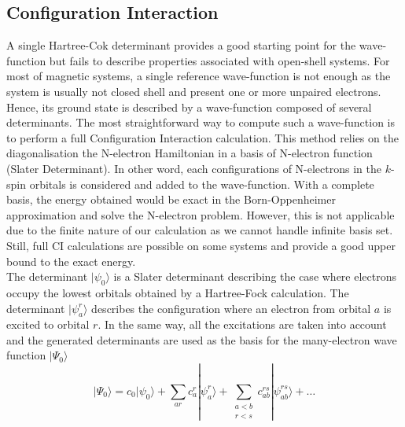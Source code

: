 \documentclass[12pt]{report}
\numberwithin{equation}{section}
\begin{document}
\subsection{Configuration Interaction}

A single Hartree-Cok determinant provides a good starting point for the wave-function but fails to describe properties associated with open-shell systems.
For most of magnetic systems, a single reference wave-function is not enough as the system is usually not closed shell and present one or more unpaired electrons.
Hence, its ground state is described by a wave-function composed of several determinants.
The most straightforward way to compute such a wave-function is to perform a full Configuration Interaction calculation.
This method relies on the diagonalisation the N-electron Hamiltonian in a basis of N-electron function (Slater Determinant).
In other word, each configurations of N-electrons in the $k$-spin orbitals is considered and added to the wave-function.
With a complete basis, the energy obtained would be exact in the Born-Oppenheimer approximation and solve the N-electron problem.
However, this is not applicable due to the finite nature of our calculation as we cannot handle infinite basis set.
Still, full CI calculations are possible on some systems and provide a good upper bound to the exact energy. \\
The determinant $|\psi_0\rangle$ is a Slater determinant describing the case where electrons occupy the lowest orbitals obtained by a Hartree-Fock calculation.
The determinant $|\psi_a^r\rangle$ describes the configuration where an electron from orbital $a$ is excited to orbital $r$.
In the same way, all the excitations are taken into account and the generated determinants are used as the basis for the many-electron wave function $|\Psi_0\rangle$
\begin{equation}\label{eq:FullCI}
    | \Psi_0 \rangle = c_0 |\psi_0 \rangle + \sum_{ar} c_a^r |\psi_a^r \rangle + \sum_{\substack{a<b\\ r<s}} c_{ab}^{rs} |\psi_{ab}^{rs} \rangle + \ldots
\end{equation}
\end{document}
